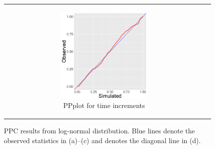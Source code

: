 \documentclass[ba]{imsart}
\numberwithin{equation}{section}
\theoremstyle{plain}
\begin{document}
\begin{figure}[!t]
\begin{tabular}[t]{cc}
\begin{subfigure}[b]{0.495\textwidth}
			\end{subfigure}
			\begin{subfigure}[b]{0.495\textwidth}
				\centering
				\caption{PPplot for time increments}
				\includegraphics[width=0.56\textwidth]{img/timePPplot-1.png}	
			\end{subfigure}
		\end{tabular}
		\caption {PPC results from log-normal distribution. Blue lines denote the observed statistics in (a)--(c) and denotes the diagonal line in (d).}
		\label{figure:PPCresults}
	\end{figure}
	
\end{document}
